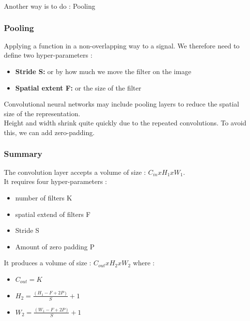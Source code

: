 \documentclass[../main.tex]{subfiles}
\begin{document}
Another way is to do : Pooling\\

\subsubsection{Pooling}
Applying a function in a non-overlapping way to a signal. We therefore need to define two hyper-parameters : \begin{itemize}    \item \textbf{Stride S:} or by how much we move the filter on the image \\
    \item \textbf{Spatial extent F:} or the size of the filter\\
\end{itemize}

Convolutional neural networks may include pooling layers to reduce the spatial size of the representation.\\

Height and width shrink quite quickly due to the repeated convolutions. To avoid this, we can add zero-padding.

\subsubsection{Summary}
The convolution layer accepts a volume of size : $C_{in} x H_1 x W_1$.\\
It requires four hyper-parameters : \begin{itemize}
    \item number of filters K\\
    \item spatial extend of filters F\\
    \item Stride S\\
    \item Amount of zero padding P\\
\end{itemize}

It produces a volume of size : $C_{out} x H_2 x W_2$ where : \begin{itemize}
    \item $C_{out} = K$\\
    \item $H_2 = \frac{(H_1-F+2P)}{S}+1$\\
    \item $W_2 = \frac{(W_1-F+2P)}{S}+1$\\
\end{itemize}
\end{document}
